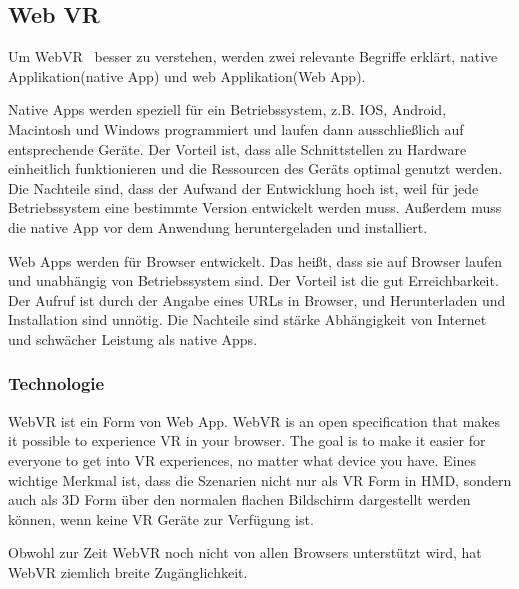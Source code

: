  \subsection{Web VR}
 Um \glqq WebVR \grqq\ besser zu verstehen, werden zwei relevante Begriffe erklärt, native Applikation(native App) und web Applikation(Web App).
 
 Native Apps werden speziell für ein Betriebssystem, z.B. IOS, Android, Macintosh und Windows programmiert und laufen dann ausschließlich auf entsprechende Geräte. Der Vorteil ist, \glqq dass alle Schnittstellen zu Hardware einheitlich funktionieren und die Ressourcen des Geräts optimal genutzt werden\grqq.\citep{22} Die Nachteile sind, dass der Aufwand der Entwicklung hoch ist, weil für jede Betriebssystem eine bestimmte Version entwickelt werden muss. Außerdem muss die native App vor dem Anwendung heruntergeladen und installiert.
 
 Web Apps werden für Browser entwickelt. Das heißt, dass sie auf Browser laufen und unabhängig von Betriebssystem sind. Der Vorteil ist die gut Erreichbarkeit. Der Aufruf ist durch der Angabe eines URLs in Browser, und Herunterladen und Installation sind unnötig. Die Nachteile sind stärke Abhängigkeit von Internet und schwächer Leistung als native Apps.
 
  \subsubsection{Technologie}
 WebVR ist ein Form von Web App. \glqq WebVR is an open specification that makes it possible to experience VR in your browser. The goal is to make it easier for everyone to get into VR experiences, no matter what device you have. \grqq \citep{21} Eines wichtige Merkmal ist, dass die Szenarien nicht nur als VR Form in HMD, sondern auch als 3D Form über den normalen flachen Bildschirm dargestellt werden können, wenn keine VR Geräte zur Verfügung ist.
 
 Obwohl zur Zeit WebVR noch nicht von allen Browsers unterstützt wird, hat WebVR ziemlich breite Zugänglichkeit.
 
